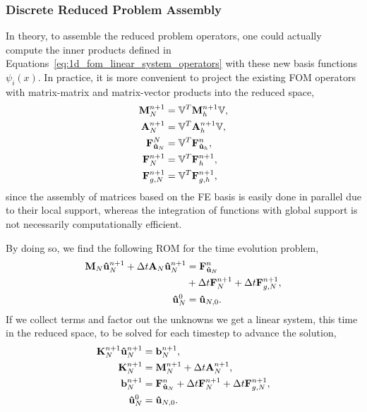 \documentclass[../main.tex]{subfiles}
\newcommand{\rbV}{\ensuremath{\mathbb{V}}}
\newcommand{\rbVT}{\ensuremath{\rbV^T}}
\begin{document}
\subsubsection{Discrete Reduced Problem Assembly}
In theory, to assemble the reduced problem operators, one could actually compute the inner products defined in Equations~\eqref{eq:1d_fom_linear_system_operators} with these new basis functions $\psi_i(x)$.
In practice, it is more convenient to project the existing FOM operators with matrix-matrix and matrix-vector products into the reduced space, 
\begin{subequations}
    \label{eq:1d_rom_linear_system_operators}
    \begin{align}
        \vb{M}_{N}^{n+1} &= \rbVT \vb{M}_{h}^{n+1} \rbV, \\
        \vb{A}_{N}^{n+1} &= \rbVT \vb{A}_{h}^{n+1} \rbV, \\
        \vb{F}_{\vb{\hat{u}}_N}^{N} &= \rbVT \vb{F}_{\vb{\hat{u}}_h}^{n}, \\
        \vb{F}_{N}^{n+1} &= \rbVT \vb{F}_{h}^{n+1},  \\
        \vb{F}_{{g,N}}^{n+1} &= \rbVT \vb{F}_{{g,h}}^{n+1},
    \end{align}
\end{subequations}
since the assembly of matrices based on the FE basis is easily done in parallel due to their local support, 
whereas the integration of functions with global support is not necessarily computationally efficient.

By doing so, we find the following ROM for the time evolution problem,
\begin{subequations}
    \label{eq:1d_rom_weak_formulation_discrete}
    \begin{align}
        \vb{M}_N \vb{\hat{u}}_{N}^{n+1} + \Delta t \vb{A}_N \vb{\hat{u}}_{N}^{n+1} &= \vb{F}^{n}_{\vb{\hat{u}}_N} \\
        &+ \Delta t \vb{F}_N^{n+1} + \Delta t \vb{F}^{n+1}_{g, N}, \nonumber \\
        \vb{\hat{u}}_N^{0} &= \vb{\hat{u}}_{N,0}.
    \end{align}
\end{subequations}
If we collect terms and factor out the unknowns we get a linear system, this time in the reduced space, to be solved for each timestep to advance the solution,
\begin{subequations}
    \label{eq:1d_rom_linear_system_timestep}
    \begin{align}
        \vb{K}_N^{n+1} \vb{\hat{u}}_N^{n+1} &= \vb{b}_N^{n+1}, \\
        \vb{K}_N^{n+1} &= \vb{M}_{N}^{n+1} + \Delta t \vb{A}_{N}^{n+1}, \\
        \vb{b}_N^{n+1} &= \vb{F}_{\vb{\hat{u}}_N}^{n} + \Delta t \vb{F}_N^{n+1} + \Delta t \vb{F}_{g,N}^{n+1}, \\
        \vb{\hat{u}}_N^{0} &= \vb{\hat{u}}_{N,0}.
    \end{align}
\end{subequations}
\end{document}
